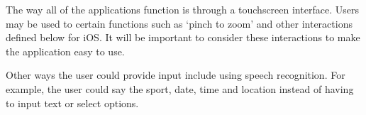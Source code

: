 The way all of the applications function is through a touchscreen interface.
Users may be used to certain functions such as `pinch to zoom' and other
interactions defined below for iOS\@. It will be important to consider these
interactions to make the application easy to use.

Other ways the user could provide input include using speech recognition. For
example, the user could say the sport, date, time and location instead of
having to input text or select options.

